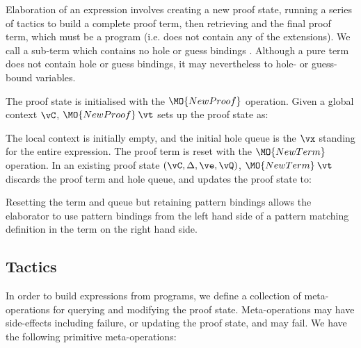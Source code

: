 Elaboration of an \Idris{} expression involves creating a new proof state,
running a series of tactics to build a complete proof term, then retrieving and
 the final proof term, which must be a \TT{} program (i.e.
does not contain any of the \TTdev{} extensions). We call a sub-term which
contains no hole or guess bindings . Although a pure term does not
contain hole or guess bindings, it may nevertheless  to hole- or
guess-bound variables.

The proof state is initialised with the $\MO{NewProof}$ operation. Given a
global context $\vC$, $\MO{NewProof}\:\vt$ sets up the proof state as:

\DM{
(\vC, \cdot, \hole{\vx}{\vt}\SC\vx, \langle\rangle, \langle\vx\rangle)
}

The local context is initially empty, and the initial hole queue is the $\vx$ standing for
the entire expression. The proof term is reset with the $\MO{NewTerm}$ operation.
In an existing proof state $(\vC, \Delta, \ve, \vQ)$,
$\MO{NewTerm}\:\vt$ discards the proof term and hole queue, and
updates the proof state to:

\DM{
(\vC, \Delta, \hole{\vx}{\vt}\SC\vx, \langle\rangle, \langle\vx\rangle)
}

Resetting the term and queue but retaining pattern bindings
allows the elaborator to use pattern bindings from the left
hand side of a pattern matching definition in the term on the right hand side.


\newcommand{\Check}{\MO{Check}_\Gamma}
\newcommand{\Eval}{\MO{Normalise}_\Gamma}
\newcommand{\Unify}{\MO{Unify}_\Gamma}
\newcommand{\PrimUnify}{\MO{PrimUnify}_\Gamma}
\newcommand{\Subst}{\MO{Subst}}

\subsection{Tactics}

In order to build \TT{} expressions from \Idris{} programs, we define a collection
of meta-operations for querying and modifying the proof state. Meta-operations
may have side-effects including failure, or updating the proof state, and
may fail. We have the following primitive meta-operations:

